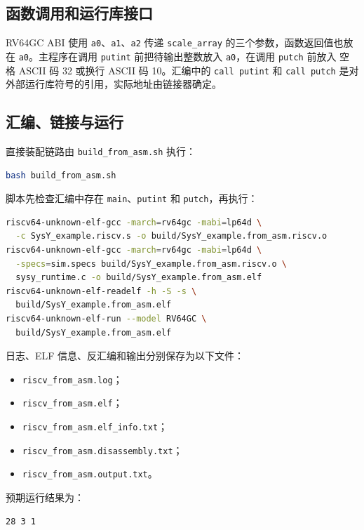 \documentclass[a4paper]{article}
\begin{document}
\subsection{函数调用和运行库接口}

RV64GC ABI 使用 \texttt{a0}、\texttt{a1}、\texttt{a2} 传递
\texttt{scale\_array} 的三个参数，函数返回值也放在 \texttt{a0}。主程序在调用
\texttt{putint} 前把待输出整数放入 \texttt{a0}，在调用 \texttt{putch} 前放入
空格 ASCII 码 32 或换行 ASCII 码 10。汇编中的 \texttt{call putint} 和
\texttt{call putch} 是对外部运行库符号的引用，实际地址由链接器确定。

\subsection{汇编、链接与运行}

直接装配链路由 \texttt{build\_from\_asm.sh} 执行：

\begin{lstlisting}[language=bash,caption={直接装配已生成汇编并运行}]
bash build_from_asm.sh
\end{lstlisting}

脚本先检查汇编中存在 \texttt{main}、\texttt{putint} 和 \texttt{putch}，再执行：

\begin{lstlisting}[language=bash,caption={汇编、链接和模拟器命令}]
riscv64-unknown-elf-gcc -march=rv64gc -mabi=lp64d \
  -c SysY_example.riscv.s -o build/SysY_example.from_asm.riscv.o
riscv64-unknown-elf-gcc -march=rv64gc -mabi=lp64d \
  -specs=sim.specs build/SysY_example.from_asm.riscv.o \
  sysy_runtime.c -o build/SysY_example.from_asm.elf
riscv64-unknown-elf-readelf -h -S -s \
  build/SysY_example.from_asm.elf
riscv64-unknown-elf-run --model RV64GC \
  build/SysY_example.from_asm.elf
\end{lstlisting}

日志、ELF 信息、反汇编和输出分别保存为以下文件：
\begin{itemize}
  \item \texttt{riscv\_from\_asm.log}；
  \item \texttt{riscv\_from\_asm.elf}；
  \item \texttt{riscv\_from\_asm.elf\_info.txt}；
  \item \texttt{riscv\_from\_asm.disassembly.txt}；
  \item \texttt{riscv\_from\_asm.output.txt}。
\end{itemize}
预期运行结果为：

\begin{lstlisting}[language={},caption={直接装配链路输出}]
28 3 1
\end{lstlisting}
\end{document}
